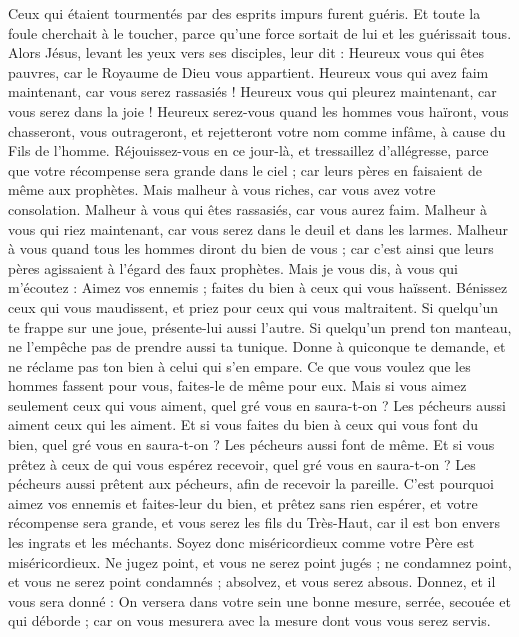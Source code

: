 \begin{multicols}{2}
Ceux qui étaient tourmentés par des esprits impurs furent guéris.
Et toute la foule cherchait à le toucher, parce qu’une force sortait de lui et les guérissait tous.
Alors Jésus, levant les yeux vers ses disciples, leur dit : Heureux vous qui êtes pauvres, car le Royaume de Dieu vous appartient.
Heureux vous qui avez faim maintenant, car vous serez rassasiés ! Heureux vous qui pleurez maintenant, car vous serez dans la joie !
Heureux serez-vous quand les hommes vous haïront, vous chasseront, vous outrageront, et rejetteront votre nom comme infâme, à cause du Fils de l'homme.
Réjouissez-vous en ce jour-là, et tressaillez d’allégresse, parce que votre récompense sera grande dans le ciel ; car leurs pères en faisaient de même aux prophètes.
Mais malheur à vous riches, car vous avez votre consolation.
Malheur à vous qui êtes rassasiés, car vous aurez faim. Malheur à vous qui riez maintenant, car vous serez dans le deuil et dans les larmes.
Malheur à vous quand tous les hommes diront du bien de vous ; car c’est ainsi que leurs pères agissaient à l’égard des faux prophètes.
Mais je vous dis, à vous qui m’écoutez : Aimez vos ennemis ; faites du bien à ceux qui vous haïssent.
Bénissez ceux qui vous maudissent, et priez pour ceux qui vous maltraitent.
Si quelqu’un te frappe sur une joue, présente-lui aussi l'autre. Si quelqu'un prend ton manteau, ne l'empêche pas de prendre aussi ta tunique.
Donne à quiconque te demande, et ne réclame pas ton bien à celui qui s’en empare.
Ce que vous voulez que les hommes fassent pour vous, faites-le de même pour eux.
Mais si vous aimez seulement ceux qui vous aiment, quel gré vous en saura-t-on ? Les pécheurs aussi aiment ceux qui les aiment.
Et si vous faites du bien à ceux qui vous font du bien, quel gré vous en saura-t-on ? Les pécheurs aussi font de même.
Et si vous prêtez à ceux de qui vous espérez recevoir, quel gré vous en saura-t-on ? Les pécheurs aussi prêtent aux pécheurs, afin de recevoir la pareille.
C'est pourquoi aimez vos ennemis et faites-leur du bien, et prêtez sans rien espérer, et votre récompense sera grande, et vous serez les fils du Très-Haut, car il est bon envers les ingrats et les méchants.
Soyez donc miséricordieux comme votre Père est miséricordieux.
Ne jugez point, et vous ne serez point jugés ; ne condamnez point, et vous ne serez point condamnés ; absolvez, et vous serez absous.
Donnez, et il vous sera donné : On versera dans votre sein une bonne mesure, serrée, secouée et qui déborde ; car on vous mesurera avec la mesure dont vous vous serez servis.

\end{multicols}
